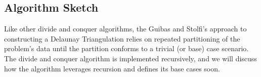 \documentclass[12pt,twoside]{reedthesis}
\begin{document}





  \subsection{Algorithm Sketch}
  \label{sub:Algortithm Sketch}
    Like other divide and conquer algorithms, the Guibas and Stolfi's approach to constructing a Delaunay Triangulation relies on repeated partitioning of the problem's data until the partition conforms to a trivial (or base) case scenario. The divide and conquer algorithm is implemented recursively, and we will discuss how the algorithm leverages recursion and defines its base cases soon. \par
\end{document}
